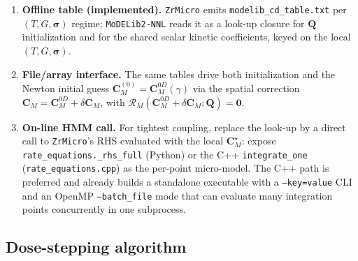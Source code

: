 \documentclass[11pt]{article}
\newcommand{\CM}{\mathbf{C}_{M}}
\newcommand{\sig}{\bm{\sigma}}
\newcommand{\ZrMicro}{\texttt{ZrMicro}}
\newcommand{\MoDELib}{\texttt{MoDELib2-NNL}}
\newcommand{\code}[1]{\texttt{#1}}
\begin{document}
\begin{enumerate}[label=(\arabic*),leftmargin=1.6em]
\item \textbf{Offline table (implemented).} \ZrMicro{} emits
\code{modelib\_cd\_table.txt} per $(T,G,\sig)$ regime; \MoDELib{} reads it as a
look-up closure for $\mathbf Q$ initialization and for the shared scalar kinetic
coefficients, keyed on the local $(T,G,\sig)$.
\item \textbf{File/array interface.} The same tables drive both initialization and
the Newton initial guess $\CM^{(0)}=\CM^{0D}(\gamma)$ via the spatial correction
$\CM=\CM^{0D}+\delta\CM$, with $\mathcal R_M(\CM^{0D}+\delta\CM;\mathbf Q)=\mathbf0$.
\item \textbf{On-line HMM call.} For tightest coupling, replace the look-up by a
direct call to \ZrMicro{}'s RHS evaluated with the local $\CM^\star$: expose
\code{rate\_equations.\_rhs\_full} (Python) or the C++ \code{integrate\_one}
(\code{rate\_equations.cpp}) as the per-point micro-model. The C++ path is
preferred and already builds a standalone executable with a \code{--key=value}
CLI and an OpenMP \code{--batch\_file} mode that can evaluate many integration
points concurrently in one subprocess.
\end{enumerate}

\subsection{Dose-stepping algorithm}
\label{sec:algorithm}
\end{document}

